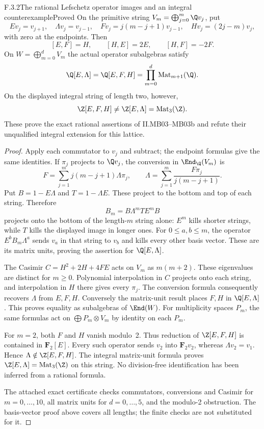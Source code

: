 \begin{result}{F.3.2}{The rational Lefschetz operator images and an integral counterexample}{Proved}
On the primitive string $V_m=\bigoplus_{j=0}^m\Q v_j$, put
\[
 Ev_j=v_{j+1},\quad \Lambda v_j=v_{j-1},\quad
 Fv_j=j(m-j+1)v_{j-1},\quad Hv_j=(2j-m)v_j,
\]
with zero at the endpoints. Then
\[
 [E,F]=H,\qquad[H,E]=2E,\qquad[H,F]=-2F.
\]
On $W=\bigoplus_{m=0}^dV_m$ the actual operator subalgebras satisfy
\[
 \Q[E,\Lambda]=\Q[E,F,H]
 =\prod_{m=0}^d\operatorname{Mat}_{m+1}(\Q).
\]
On the displayed integral string of length two, however,
\[
 \Z[E,F,H]\ne\Z[E,\Lambda]=\operatorname{Mat}_3(\Z).
\]
These prove the exact rational assertions of II.MB03--MB03b and refute their unqualified integral extension for this lattice.
\end{result}
\begin{proof}
Apply each commutator to $v_j$ and subtract; the endpoint formulas give the same identities. If $\pi_j$ projects to $\Q v_j$, the conversion in $\End_\Q(V_m)$ is
\[
 F=\sum_{j=1}^m j(m-j+1)\Lambda\pi_j,
 \qquad
 \Lambda=\sum_{j=1}^m\frac{F\pi_j}{j(m-j+1)}.
\]
Put $B=1-E\Lambda$ and $T=1-\Lambda E$. These project to the bottom and top of each string. Therefore
\[
 B_m=B\Lambda^mTE^mB
\]
projects onto the bottom of the length-$m$ string alone: $E^m$ kills shorter strings, while $T$ kills the displayed image in longer ones. For $0\leq a,b\leq m$, the operator $E^bB_m\Lambda^a$ sends $v_a$ in that string to $v_b$ and kills every other basis vector. These are its matrix units, proving the assertion for $\Q[E,\Lambda]$.

The Casimir $C=H^2+2H+4FE$ acts on $V_m$ as $m(m+2)$. These eigenvalues are distinct for $m\geq0$. Polynomial interpolation in $C$ projects onto each string, and interpolation in $H$ there gives every $\pi_j$. The conversion formula consequently recovers $\Lambda$ from $E,F,H$. Conversely the matrix-unit result places $F,H$ in $\Q[E,\Lambda]$. This proves equality as subalgebras of $\End(W)$. For multiplicity spaces $P_m$, the same formulas act on $\bigoplus P_m\otimes V_m$ by identity on each $P_m$.

For $m=2$, both $F$ and $H$ vanish modulo~2. Thus reduction of $\Z[E,F,H]$ is contained in $\mathbf F_2[E]$. Every such operator sends $v_2$ into $\mathbf F_2v_2$, whereas $\Lambda v_2=v_1$. Hence $\Lambda\notin\Z[E,F,H]$. The integral matrix-unit formula proves $\Z[E,\Lambda]=\operatorname{Mat}_3(\Z)$ on this string. No division-free identification has been inferred from a rational formula.

The attached exact certificate checks commutators, conversions and Casimir for $m=0,\ldots,10$, all matrix units for $d=0,\ldots,5$, and the modulo-2 obstruction. The basis-vector proof above covers all lengths; the finite checks are not substituted for it.
\end{proof}

